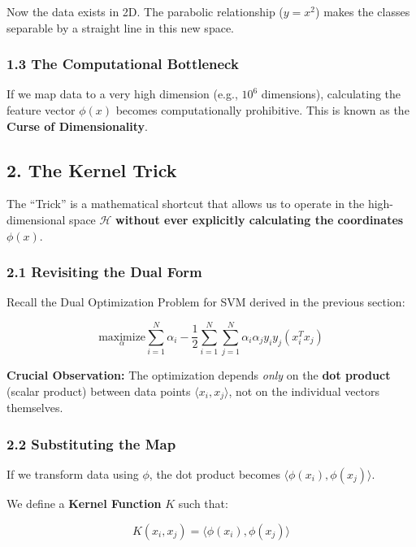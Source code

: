 \documentclass[
  italian,
  11pt,
]{article}
\begin{document}
Now the data exists in 2D. The parabolic relationship (\(y = x^2\))
makes the classes separable by a straight line in this new space.

\subsubsection{1.3 The Computational
Bottleneck}\label{the-computational-bottleneck}

If we map data to a very high dimension (e.g., \(10^6\) dimensions),
calculating the feature vector \(\phi(x)\) becomes computationally
prohibitive. This is known as the \textbf{Curse of Dimensionality}.

\subsection{2. The Kernel Trick}\label{the-kernel-trick}

The ``Trick'' is a mathematical shortcut that allows us to operate in
the high-dimensional space \(\mathcal{H}\) \textbf{without ever
explicitly calculating the coordinates \(\phi(x)\)}.

\subsubsection{2.1 Revisiting the Dual
Form}\label{revisiting-the-dual-form}

Recall the Dual Optimization Problem for SVM derived in the previous
section:

\[\underset{\alpha}{\text{maximize}} \sum_{i=1}^N \alpha_i - \frac{1}{2} \sum_{i=1}^N \sum_{j=1}^N \alpha_i \alpha_j y_i y_j (x_i^T x_j)\]

\textbf{Crucial Observation:} The optimization depends \emph{only} on
the \textbf{dot product} (scalar product) between data points
\(\langle x_i, x_j \rangle\), not on the individual vectors themselves.

\subsubsection{2.2 Substituting the Map}\label{substituting-the-map}

If we transform data using \(\phi\), the dot product becomes
\(\langle \phi(x_i), \phi(x_j) \rangle\).

We define a \textbf{Kernel Function} \(K\) such that:

\[K(x_i, x_j) = \langle \phi(x_i), \phi(x_j) \rangle\]
\end{document}
